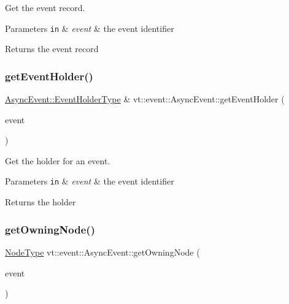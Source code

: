 Get the event record. 


\begin{DoxyParams}[1]{Parameters}
\mbox{\tt in}  & {\em event} & the event identifier\\
\hline
\end{DoxyParams}
\begin{DoxyReturn}{Returns}
the event record 
\end{DoxyReturn}
\mbox{\label{structvt_1_1event_1_1_async_event_a27d14dba4b35f66aad75d46fb56227a9}} 
\subsubsection{\texorpdfstring{get\+Event\+Holder()}{getEventHolder()}}
{\footnotesize\ttfamily \hyperlink{structvt_1_1event_1_1_async_event_a6b529d829ccb5b12c50c2b1978c41a86}{Async\+Event\+::\+Event\+Holder\+Type} \& vt\+::event\+::\+Async\+Event\+::get\+Event\+Holder (\begin{DoxyParamCaption}\item[{\hyperlink{namespacevt_a009267401def7ae8bf201892222d060f}{Event\+Type} const \&}]{event }\end{DoxyParamCaption})}



Get the holder for an event. 


\begin{DoxyParams}[1]{Parameters}
\mbox{\tt in}  & {\em event} & the event identifier\\
\hline
\end{DoxyParams}
\begin{DoxyReturn}{Returns}
the holder 
\end{DoxyReturn}
\mbox{\label{structvt_1_1event_1_1_async_event_a288c3db66bf12de8dc65733b184870c0}} 
\subsubsection{\texorpdfstring{get\+Owning\+Node()}{getOwningNode()}}
{\footnotesize\ttfamily \hyperlink{namespacevt_a866da9d0efc19c0a1ce79e9e492f47e2}{Node\+Type} vt\+::event\+::\+Async\+Event\+::get\+Owning\+Node (\begin{DoxyParamCaption}\item[{\hyperlink{namespacevt_a009267401def7ae8bf201892222d060f}{Event\+Type} const \&}]{event }\end{DoxyParamCaption})}



